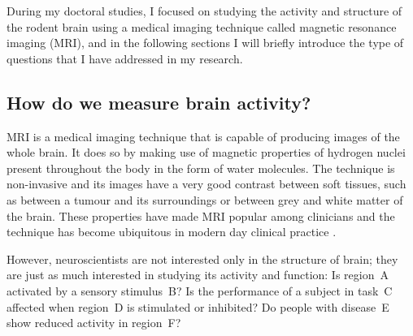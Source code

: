 During my doctoral studies, I focused on studying the activity and structure of
the rodent brain using a medical imaging technique called magnetic resonance
imaging (MRI), and in the following sections I will briefly introduce the type
of questions that I have addressed in my research. 

\subsection{How do we measure brain activity?}

MRI is a medical imaging technique that is capable of producing images of the whole
brain. It does so by making use of magnetic properties of hydrogen nuclei
present throughout the body in the form of water molecules. The technique is
non-invasive and its images have a very good contrast between soft tissues,
such as between a tumour and its surroundings or between grey and white matter
of the brain. These properties have made MRI popular among clinicians and the
technique has become ubiquitous in modern day clinical practice
\parencite{westbrook2011}.

However, neuroscientists are not interested only in the structure of brain; they
are just as much interested in studying its activity and function: Is region~A
activated by a sensory stimulus~B? Is the performance of a subject in task~C
affected when region~D is stimulated or inhibited? Do people with disease~E show
reduced activity in region~F?


